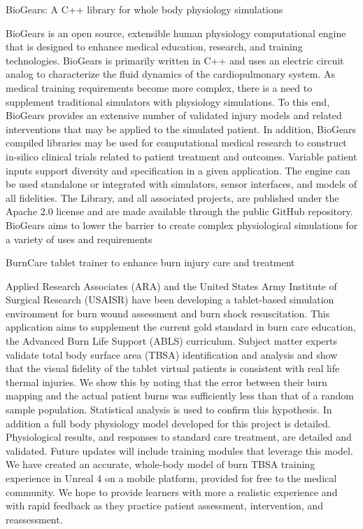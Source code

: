   \cventry
    {BioGears: A C++ library for whole body physiology simulations} %
    {} %
    {} %
    {} %
     {
    \begin{cvitems} %
    \item {BioGears is an open source, extensible human physiology computational engine that is designed to enhance medical education, research, and training technologies. BioGears is primarily written in C++ and uses an electric circuit analog to characterize the fluid dynamics of the cardiopulmonary system. As medical training requirements become more complex, there is a need to supplement traditional simulators with physiology simulations. To this end, BioGears provides an extensive number of validated injury models and related interventions that may be applied to the simulated patient. In addition, BioGears compiled libraries may be used for computational medical research to construct in-silico clinical trials related to patient treatment and outcomes. Variable patient inputs support diversity and specification in a given application. The engine can be used standalone or integrated with simulators, sensor interfaces, and models of all fidelities. The Library, and all associated projects, are published under the Apache 2.0 license and are made available through the public GitHub repository. BioGears aims to lower the barrier to create complex physiological simulations for a variety of uses and requirements}
    \end{cvitems}
     }

  \cventry
    {BurnCare tablet trainer to enhance burn injury care and treatment} %
    {} %
    {} %
    {} %
     {
    \begin{cvitems} %
    \item {Applied Research Associates (ARA) and the United States Army Institute of Surgical Research (USAISR) have been developing a tablet-based simulation environment for burn wound assessment and burn shock resuscitation. This application aims to supplement the current gold standard in burn care education, the Advanced Burn Life Support (ABLS) curriculum. Subject matter experts validate total body surface area (TBSA) identification and analysis and show that the visual fidelity of the tablet virtual patients is consistent with real life thermal injuries. We show this by noting that the error between their burn mapping and the actual patient burns was sufficiently less than that of a random sample population. Statistical analysis is used to confirm this hypothesis. In addition a full body physiology model developed for this project is detailed. Physiological results, and responses to standard care treatment, are detailed and validated. Future updates will include training modules that leverage this model. We have created an accurate, whole-body model of burn TBSA training experience in Unreal 4 on a mobile platform, provided for free to the medical community. We hope to provide learners with more a realistic experience and with rapid feedback as they practice patient assessment, intervention, and reassessment.}
    \end{cvitems}
     }
\newpage